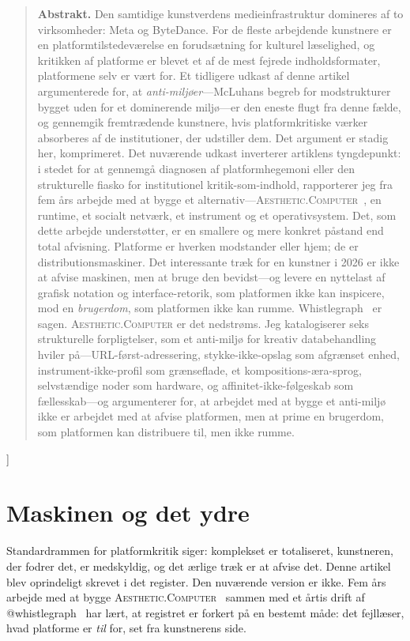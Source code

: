 \documentclass[10pt,letterpaper,twocolumn]{article}
\newcommand{\ac}{\textsc{Aesthetic.Computer}}
\begin{document}
{\begin{quote}
\small\noindent\textbf{Abstrakt.}
Den samtidige kunstverdens medieinfrastruktur domineres af to virksomheder: Meta og ByteDance. For de fleste arbejdende kunstnere er en platformtilstedeværelse en forudsætning for kulturel læselighed, og kritikken af platforme er blevet et af de mest fejrede indholdsformater, platformene selv er vært for. Et tidligere udkast af denne artikel argumenterede for, at \emph{anti-miljøer}---McLuhans begreb for modstrukturer bygget uden for et dominerende miljø---er den eneste flugt fra denne fælde, og gennemgik fremtrædende kunstnere, hvis platformkritiske værker absorberes af de institutioner, der udstiller dem. Det argument er stadig her, komprimeret. Det nuværende udkast inverterer artiklens tyngdepunkt: i stedet for at gennemgå diagnosen af platformhegemoni eller den strukturelle fiasko for institutionel kritik-som-indhold, rapporterer jeg fra fem års arbejde med at bygge et alternativ---\ac{}~\citep{scudder2026ac}, en runtime, et socialt netværk, et instrument og et operativsystem. Det, som dette arbejde understøtter, er en smallere og mere konkret påstand end total afvisning. Platforme er hverken modstander eller hjem; de er distributionsmaskiner. Det interessante træk for en kunstner i 2026 er ikke at afvise maskinen, men at bruge den bevidst---og levere en nyttelast af grafisk notation og interface-retorik, som platformen ikke kan inspicere, mod en \emph{brugerdom}, som platformen ikke kan rumme. Whistlegraph~\citep{scudder2026whistlegraph} er sagen. \ac{} er det nedstrøms. Jeg katalogiserer seks strukturelle forpligtelser, som et anti-miljø for kreativ databehandling hviler på---URL-først-adressering, stykke-ikke-opslag som afgrænset enhed, instrument-ikke-profil som grænseflade, et kompositions-æra-sprog, selvstændige noder som hardware, og affinitet-ikke-følgeskab som fællesskab---og argumenterer for, at arbejdet med at bygge et anti-miljø ikke er arbejdet med at afvise platformen, men at prime en brugerdom, som platformen kan distribuere til, men ikke rumme.
\end{quote}
\vspace{0.5em}
}]

\section{Maskinen og det ydre}

Standardrammen for platformkritik siger: komplekset er totaliseret, kunstneren, der fodrer det, er medskyldig, og det ærlige træk er at afvise det. Denne artikel blev oprindeligt skrevet i det register. Den nuværende version er ikke. Fem års arbejde med at bygge \ac{}~\citep{scudder2026ac} sammen med et årtis drift af @whistlegraph~\citep{scudder2026whistlegraph} har lært, at registret er forkert på en bestemt måde: det fejllæser, hvad platforme er \emph{til} for, set fra kunstnerens side.
\end{document}

